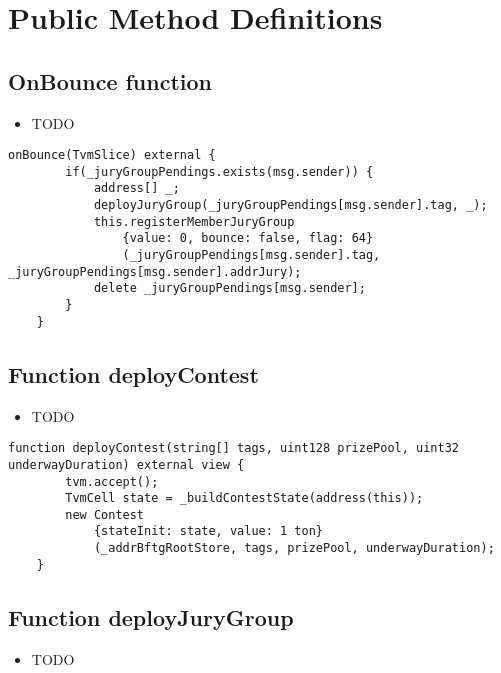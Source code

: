 \section{Public Method Definitions}


\subsection{OnBounce function}

\begin{itemize}
\item TODO
\end{itemize}

\begin{lstlisting}[firstnumber=83]
    onBounce(TvmSlice) external {
        if(_juryGroupPendings.exists(msg.sender)) {
            address[] _;
            deployJuryGroup(_juryGroupPendings[msg.sender].tag, _);
            this.registerMemberJuryGroup
                {value: 0, bounce: false, flag: 64}
                (_juryGroupPendings[msg.sender].tag, _juryGroupPendings[msg.sender].addrJury);
            delete _juryGroupPendings[msg.sender];
        }
    }
\end{lstlisting}

\subsection{Function deployContest}

\begin{itemize}
\item TODO
\end{itemize}

\begin{lstlisting}[firstnumber=98]
    function deployContest(string[] tags, uint128 prizePool, uint32 underwayDuration) external view {
        tvm.accept();
        TvmCell state = _buildContestState(address(this));
        new Contest
            {stateInit: state, value: 1 ton}
            (_addrBftgRootStore, tags, prizePool, underwayDuration);
    }
\end{lstlisting}

\subsection{Function deployJuryGroup}

\begin{itemize}
\item TODO
\end{itemize}

